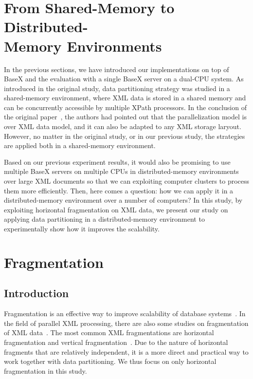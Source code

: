 

\section{From Shared-Memory to Distributed-\\Memory Environments}

In the previous sections, we have introduced our implementations on top of BaseX
and the evaluation with a single BaseX server on a dual-CPU system. As
introduced in the original study, data partitioning strategy was studied in a
shared-memory environment, where XML data is stored in a shared memory and can
be concurrently accessible by multiple XPath processors. In the conclusion of
the original paper~\cite{BoLS09},  the authors had pointed out that the
parallelization model is over XML data model, and it can also be adapted to any
XML storage laryout. However,  no matter in the original study, or in our
previous study, the strategies  are applied both in a shared-memory environment. 

Based on our previous experiment results, it would also be promising to use
multiple BaseX servers on multiple CPUs in distributed-memory environments over
large XML documents so that we can exploiting computer clusters to process 
them more efficiently. Then, here comes a question:  how we can apply it in a
distributed-memory environment over a number of computers? 
In this study, by exploiting horizontal fragmentation on XML data, we present our
study on applying data partitioning in a distributed-memory  environment to
experimentally show how it improves the scalability.



\section{Fragmentation}

\subsection{Introduction}
Fragmentation is an effective way to improve scalability of database
systems~\cite{navathe1995mixed, hauglid2010dyfram, khan2010new}.  In the field
of parallel XML processing, there are also some studies on  fragmentation of XML
data~\cite{kling11:dist_xml, KlOD10}.  The most common XML fragmentations are
horizontal fragmentation and vertical fragmentation~\cite{kling11:dist_xml}. Due
to the nature of horizontal fragments that are  relatively independent, it is a
more direct and practical way to work together with data partitioning. We thus
focus on only horizontal fragmentation in this study.

